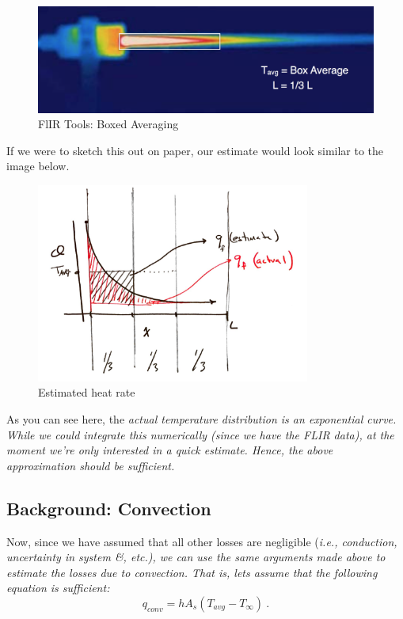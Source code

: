 \documentclass[11pt, letterpaper]{article}
\begin{document}
\begin{figure}[H]
    \begin{center}
        \includegraphics[width=125mm]{gfx/FLIR2.png}
    \caption{FlIR Tools: Boxed Averaging}\label{fig3}
    \end{center}
\end{figure}

If we were to sketch this out on paper, our estimate would look similar to the image below.

\begin{figure}[H]
    \begin{center}
        \includegraphics[width=90mm]{gfx/sketch.png}
    \caption{Estimated heat rate}\label{fig4}
    \end{center}
\end{figure}

As you can see here, the \it{actual} temperature distribution is an exponential curve. While we could integrate this numerically (since we have the FLIR data), at the moment we're only interested in a quick \it{estimate}. Hence, the above approximation should be sufficient.

\n
\subsection{Background: Convection}

Now, since we have assumed that all other losses are negligible (\it{i.e.,} conduction, uncertainty in system \&, \it{etc.}), we can use the same arguments made above to estimate the losses due to convection. That is, lets assume that the following equation is sufficient:
\begin{equation}
q_{conv} = h A_s ( T_{avg} - T_\infty ) \ .\label{Eq2}
\end{equation}
\end{document}
